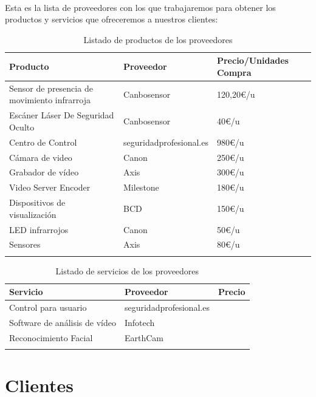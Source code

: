 \documentclass{report}
\begin{document}
        \paragraph*{}
        {
          Esta es la lista de proveedores con los que trabajaremos para obtener los productos y servicios que ofreceremos a nuestros clientes:
        }
        \begin{longtable}{|p{6cm}|p{5cm}|p{4cm}|}
          \hline
          \textbf{Producto} & \textbf{Proveedor} & \textbf{Precio/Unidades Compra}\\
          \hline
          \hline
          Sensor de presencia de movimiento infrarroja & Canbosensor & 120,20€/u \\
          \hline
          Escáner Láser De Seguridad Oculto & Canbosensor & 40€/u\\
          \hline
          Centro de Control & seguridadprofesional.es & 980€/u\\
          \hline
          Cámara de video & Canon & 250€/u\\
          \hline
          Grabador de vídeo & Axis & 300€/u\\
          \hline
          Video Server Encoder & Milestone & 180€/u\\
          \hline
          Dispositivos de visualización & BCD & 150€/u\\
          \hline
          LED infrarrojos & Canon & 50€/u\\
          \hline
          Sensores & Axis & 80€/u\\
          \hline
          \caption{Listado de productos de los proveedores}
        \end{longtable}
        \begin{longtable}{|p{6cm}|p{5cm}|p{4cm}|}
          \hline
          \textbf{Servicio} & \textbf{Proveedor} & \textbf{Precio}\\
          \hline
          \hline
          Control para usuario & seguridadprofesional.es & \\
          \hline
          Software de análisis de vídeo & Infotech & \\
          \hline
          Reconocimiento Facial & EarthCam & \\
          \hline
          \caption{Listado de servicios de los proveedores}
        \end{longtable}
      \clearpage\section{Clientes}
\end{document}
